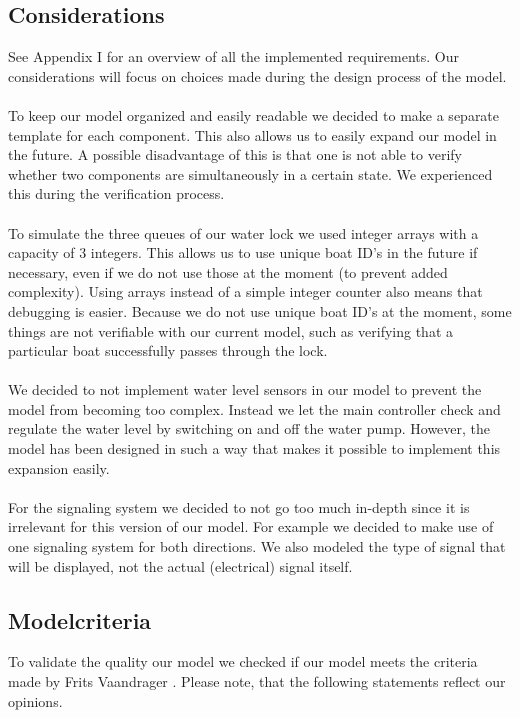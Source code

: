 \documentclass{article}
\begin{document}
    \subsection{Considerations} %
        See Appendix I for an overview of all the implemented requirements. Our considerations will focus on choices made during the design process of the model.\\\\
        To keep our model organized and easily readable we decided to make a separate template for each component. This also allows us to easily expand our model in the future. A possible disadvantage of this is that one is not able to verify whether two components are simultaneously in a certain state. We experienced this during the verification process.  \\\\
        To simulate the three queues of our water lock we used integer arrays with a capacity of 3 integers. This allows us to use unique boat ID's in the future if necessary, even if we do not use those at the moment (to prevent added complexity). Using arrays instead of a simple integer counter also means that debugging is easier. Because we do not use unique boat ID's at the moment, some things are not verifiable with our current model, such as verifying that a particular boat successfully passes through the lock. \\\\
        We decided to not implement water level sensors in our model to prevent the model from becoming too complex. Instead we let the main controller check and regulate the water level by switching on and off the water pump. However, the model has been designed in such a way that makes it possible to implement this expansion easily. \\\\
        For the signaling system we decided to not go too much in-depth since it is irrelevant for this version of our model. For example we decided to make use of one signaling system for both directions. We also modeled the type of signal that will be displayed, not the actual (electrical) signal itself. 

        
    \subsection{Modelcriteria} %
        To validate the quality our model we checked if our model meets the criteria made by Frits Vaandrager \cite{Vaandrager}. Please note, that the following statements reflect our opinions. 
        
\end{document}
